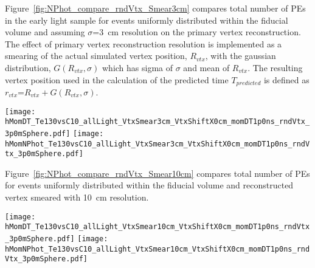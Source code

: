 Figure~\ref{fig:NPhot_compare_rndVtx_Smear3cm} compares total number of PEs in the early light sample for 
events uniformly distributed within the fiducial volume and assuming $\sigma$=3~cm resolution on the primary 
vertex reconstruction. The effect of primary vertex reconstruction resolution is implemented as a smearing of 
the actual simulated vertex position, $R_{vtx}$, with the gaussian distribution, $G(R_{vtx},\sigma)$ 
which has sigma of $\sigma$ and mean of $R_{vtx}$. The resulting vertex position used in the calculation of the
predicted time $T_{predicted}$ is defined as $r_{vtx}$=$R_{vtx} + G(R_{vtx},\sigma)$.

\begin{figure*}[ht]
  \centering
  \texttt{[image: hMomDT\_Te130vsC10\_allLight\_VtxSmear3cm\_VtxShiftX0cm\_momDT1p0ns\_rndVtx\_3p0mSphere.pdf]}
  \texttt{[image: hMomNPhot\_Te130vsC10\_allLight\_VtxSmear3cm\_VtxShiftX0cm\_momDT1p0ns\_rndVtx\_3p0mSphere.pdf]}
  \caption{(Left) Difference between measured PE arrival time and arrival time prediction based on
        vertex location (T$^{predicted} = |r_{hit} - r_{vtx}|/v_{phot}$, where $v_phot = c/1.53$).
        $\vbb$-decay (black solid line) and $\Cten$ events (magenta dashed line) are compared.
        Vertical line at 1~ns indicates cut for early light selection.
        (Right) Total number of PEs in the early light sample.
        $^{10}$C events with energy deposition in the $\pm$10\% energy range around Q-value are
        selected. Verticies are uniformly distributed within the fiducial volume, $R<3$~m.
        {\bf Vetrex is smeared with 3~cm resolution.}}
\label{fig:NPhot_compare_rndVtx_Smear3cm}
\end{figure*}


Figure~\ref{fig:NPhot_compare_rndVtx_Smear10cm} compares total number of PEs for events uniformly
distributed within the fiducial volume and reconstructed vertex smeared with 10~cm resolution.

\begin{figure*}[ht]
  \centering
  \texttt{[image: hMomDT\_Te130vsC10\_allLight\_VtxSmear10cm\_VtxShiftX0cm\_momDT1p0ns\_rndVtx\_3p0mSphere.pdf]}
  \texttt{[image: hMomNPhot\_Te130vsC10\_allLight\_VtxSmear10cm\_VtxShiftX0cm\_momDT1p0ns\_rndVtx\_3p0mSphere.pdf]}
  \caption{(Left) Difference between measured PE arrival time and arrival time prediction based on
        vertex location (T$^{predicted} = |r_{hit} - r_{vtx}|/v_{phot}$, where $v_phot = c/1.53$).
        $\vbb$-decay (black solid line) and $\Cten$ events (magenta dashed line) are compared.
        Vertical line at 1~ns indicates cut for early light selection.
        (Right) Total number of PEs in the early light sample.
        $^{10}$C events with energy deposition in the $\pm$10\% energy range around Q-value are
        selected. Verticies are uniformly distributed within the fiducial volume, $R<3$~m.
        {\bf Vetrex is smeared with 10~cm resolution.}}
\label{fig:NPhot_compare_rndVtx_Smear10cm}
\end{figure*}



